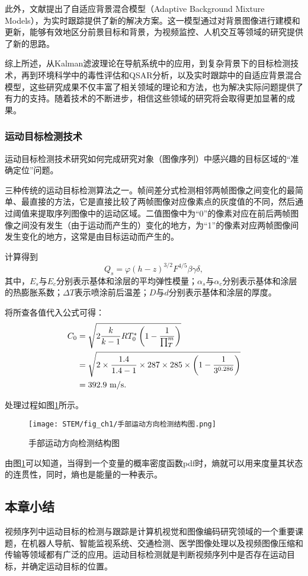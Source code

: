此外，文献\cite{Stauffer1999}提出了自适应背景混合模型（Adaptive Background Mixture Models），为实时跟踪提供了新的解决方案。这一模型通过对背景图像进行建模和更新，能够有效地区分前景目标和背景，为视频监控、人机交互等领域的研究提供了新的思路。

综上所述，从Kalman滤波理论在导航系统中的应用，到复杂背景下的目标检测技术，再到环境科学中的毒性评估和QSAR分析，以及实时跟踪中的自适应背景混合模型，这些研究成果不仅丰富了相关领域的理论和方法，也为解决实际问题提供了有力的支持。随着技术的不断进步，相信这些领域的研究将会取得更加显著的成果。

\subsubsection{运动目标检测技术}

运动目标检测技术研究如何完成研究对象（图像序列）中感兴趣的目标区域的“准确定位”问题。


三种传统的运动目标检测算法之一。帧间差分式检测相邻两帧图像之间变化的最简单、最直接的方法，它是直接比较了两帧图像对应像素点的灰度值的不同，然后通过阈值来提取序列图像中的运动区域。二值图像中为“$0$”的像素对应在前后两帧图像之间没有发生（由于运动而产生的）变化的地方，为“1”的像素对应两帧图像间发生变化的地方，这常是由目标运动而产生的。

计算得到
\begin{equation}%
Q_s = \varphi(h-z)^{3/2}F^{4/5}\beta\gamma\delta,
\end{equation}
其中，$E_s$与$E_c$分别表示基体和涂层的平均弹性模量；$\alpha_s$与$\alpha_c$分别表示基体和涂层的热膨胀系数；$\Delta T$表示喷涂前后温差；$D$与$d$分别表示基体和涂层的厚度。

将所查各值代入公式可得：
\begin{align}%
  C_0 &= \sqrt{ 2\frac{k}{k-1}RT_0^{\ast}\lt(1-\frac{1}{\prod_{T}^{m}}\rt) } \notag \\
   &= \sqrt{ 2\times \frac{1.4}{1.4-1}\times 287\times 285\times \lt( 1-\frac{1}{3^{0.286}} \rt) } \notag \\
   &= 392.9~\unit{m/s}.
\end{align}

处理过程如图\ref{fig:手部运动方向检测结构图}所示。
\begin{figure}[H]
  \centering
  \texttt{[image: STEM/fig\_ch1/手部运动方向检测结构图.png]}
  \caption{手部运动方向检测结构图}
  \label{fig:手部运动方向检测结构图}
\end{figure}

由图\ref{fig:手部运动方向检测结构图}可以知道，当得到一个变量的概率密度函数pdf时，熵就可以用来度量其状态的连贯性，同时，熵也是能量的一种表示。

\subsection{本章小结}

视频序列中运动目标的检测与跟踪是计算机视觉和图像编码研究领域的一个重要课题，在机器人导航、智能监视系统、交通检测、医学图像处理以及视频图像压缩和传输等领域都有广泛的应用。运动目标检测就是判断视频序列中是否存在运动目标，并确定运动目标的位置。
